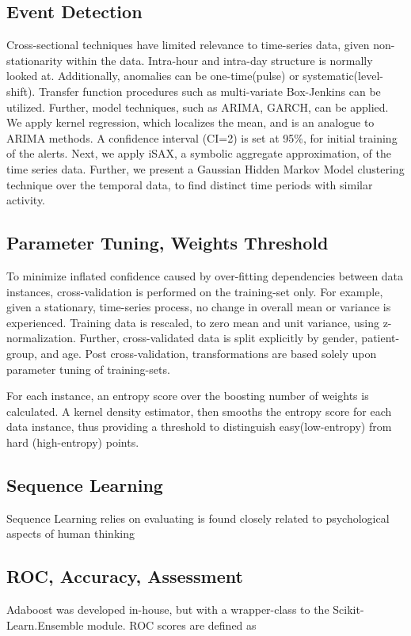 \documentclass[12pt]{article}
\begin{document}
\subsection{Event Detection}
Cross-sectional techniques have limited relevance to time-series data, given non-stationarity within the data.  Intra-hour and intra-day structure is normally looked at.  Additionally, anomalies can be one-time(pulse) or systematic(level-shift).  Transfer function procedures such as multi-variate Box-Jenkins can be utilized.  Further, model techniques, such as ARIMA, GARCH, can be applied.  We apply kernel regression, which localizes the mean, and is an analogue to ARIMA methods.  A confidence interval (CI=2) is set at 95\%, for initial training of the alerts.  Next, we apply iSAX, a symbolic aggregate approximation, of the time series data.  Further, we present a Gaussian Hidden Markov Model clustering technique over the temporal data, to find distinct time periods with similar activity.

\subsection*{Parameter Tuning, Weights Threshold}
\raggedright To minimize inflated confidence caused by over-fitting dependencies between data instances, cross-validation is performed on the training-set only.  For example, given a stationary, time-series process, no change in overall mean or variance is experienced.  Training data is rescaled, to zero mean and unit variance, using z-normalization.  Further, cross-validated data is split explicitly by gender, patient-group, and age.  Post cross-validation, transformations are based solely upon parameter tuning of training-sets.  
\raggedright For each instance, an entropy score over the boosting number of weights is calculated.  A kernel density estimator, then smooths the entropy score for each data instance, thus providing a threshold to distinguish easy(low-entropy) from hard (high-entropy) points.            


\subsection{Sequence Learning}
Sequence Learning relies on evaluating is found closely related to psychological aspects of human thinking 




\subsection*{ROC, Accuracy, Assessment}
Adaboost was developed in-house, but with a wrapper-class to the Scikit-Learn.Ensemble module.  ROC scores are defined as 
\end{document}
